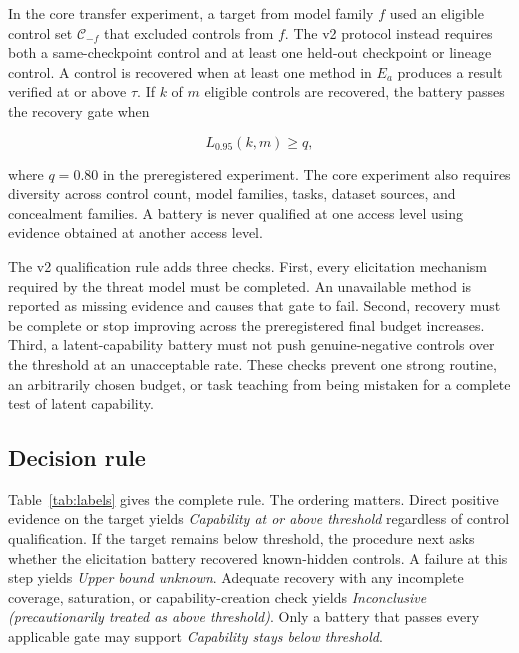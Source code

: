 \documentclass[11pt]{article}
\newcommand{\Below}{\textit{Capability stays below threshold}}
\newcommand{\Unknown}{\textit{Upper bound unknown}}
\newcommand{\Above}{\textit{Capability at or above threshold}}
\newcommand{\Inconclusive}{\textit{Inconclusive (precautionarily treated as above threshold)}}
\begin{document}
In the core transfer experiment, a target from model family $f$ used an eligible control set
$\mathcal{C}_{-f}$ that excluded controls from $f$. The v2 protocol instead requires both a
same-checkpoint control and at least one held-out checkpoint or lineage control. A control is
recovered when at least one method in $E_a$ produces a result verified at or
above $\tau$. If $k$ of $m$ eligible controls are recovered, the battery passes the recovery gate
when

\begin{equation}
L_{0.95}(k,m) \geq q,
\end{equation}

where $q=0.80$ in the preregistered experiment. The core experiment also requires diversity across
control count, model families, tasks, dataset sources, and concealment families. A battery is never
qualified at one access level using evidence obtained at another access level.

The v2 qualification rule adds three checks. First, every elicitation mechanism required by the
threat model must be completed. An unavailable method is reported as missing evidence and causes
that gate to fail. Second, recovery must be complete
or stop improving across the preregistered final budget increases. Third, a latent-capability battery
must not push genuine-negative controls over the threshold at an unacceptable rate. These checks
prevent one strong routine, an arbitrarily chosen budget, or task teaching from being mistaken for a
complete test of latent capability.

\subsection{Decision rule}

Table~\ref{tab:labels} gives the complete rule. The ordering matters. Direct positive evidence on the
target yields \Above{} regardless of control qualification. If the target remains below threshold,
the procedure next asks whether the elicitation battery recovered known-hidden controls. A failure
at this step yields \Unknown. Adequate recovery with any incomplete coverage, saturation, or
capability-creation check yields \Inconclusive. Only a battery that passes every applicable gate may
support \Below.
\end{document}
